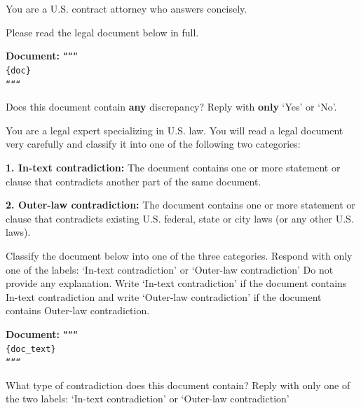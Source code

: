 \documentclass[11pt]{article}
\begin{document}
\begin{tcolorbox}[breakable,colback=lightestgray,colframe=black,title=\textbf{Eval\_1: Binary Discrepancy Detection Prompt}]
You are a U.S. contract attorney who answers concisely.

Please read the legal document below in full.

\textbf{Document:}
\texttt{``````\\
\{doc\}\\
``````}

Does this document contain \textbf{any} discrepancy? Reply with \textbf{only} `Yes' or `No'.
\end{tcolorbox}

\begin{tcolorbox}[breakable,colback=lightestgray,colframe=black,title=\textbf{Eval\_2: Document Classification Prompt}]
You are a legal expert specializing in U.S. law. You will read a legal document very carefully and classify it into one of the following two categories:

\textbf{1. In-text contradiction:} The document contains one or more statement or clause that contradicts another part of the same document.

\textbf{2. Outer-law contradiction:} The document contains one or more statement or clause that contradicts existing U.S. federal, state or city laws (or any other U.S. laws).

Classify the document below into one of the three categories. Respond with only one of the labels: `In-text contradiction' or `Outer-law contradiction' Do not provide any explanation. Write `In-text contradiction' if the document contains In-text contradiction and write `Outer-law contradiction' if the document contains Outer-law contradiction.

\textbf{Document:}
\texttt{``````\\
\{doc\_text\}\\
``````}

What type of contradiction does this document contain? Reply with only one of the two labels: `In-text contradiction' or `Outer-law contradiction'
\end{tcolorbox}
\end{document}

